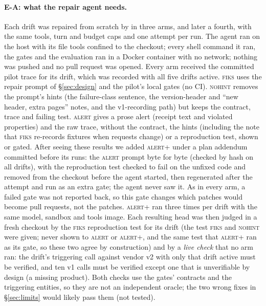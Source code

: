 \documentclass[10pt]{article}
\newcommand{\fiks}{\textsc{fiks}}
\begin{document}
\begin{table}[t]
\centering\small
\caption{E-B response mutations on recorded v1 traffic (run \texttt{\expDetectRunId}). ``Tool error'': the server returned an error result (not silent). Recall = flagged / applicable. ``Coupled'': the operator maps onto that contract kind by construction.}
\label{tab:detect}

\end{table}

\paragraph{E-A: what the repair agent needs.} Each drift was repaired from scratch by \repairModel{} in three arms, and later a fourth, with the same tools, turn and budget caps and one attempt per run. The agent ran on the host with its file tools confined to the checkout; every shell command it ran, the gates and the evaluation ran in a Docker container with no network; nothing was pushed and no pull request was opened. Every arm received the committed pilot trace for its drift, which was recorded with all five drifts active. \textsc{fiks} uses the repair prompt of \S\ref{sec:design} and the pilot's local gates (no CI). \textsc{nohint} removes the prompt's hints (the failure-class sentence, the version-header and ``new header, extra pages'' notes, and the v1-recording path) but keeps the contract, trace and failing test. \textsc{alert} gives a prose alert (receipt text and violated properties) and the raw trace, without the contract, the hints (including the note that \fiks{} re-records fixtures when requests change) or a reproduction test, shown or gated. After seeing these results we added \textsc{alert+} under a plan addendum committed before its runs: the \textsc{alert} prompt byte for byte (checked by hash on all \expAlertPromptDrifts{} drifts), with the reproduction test checked to fail on the unfixed code and removed from the checkout before the agent started, then regenerated after the attempt and run as an extra gate; the agent never saw it. As in every arm, a failed gate was not reported back, so this gate changes which patches would become pull requests, not the patches. \textsc{alert+} ran three times per drift with the same model, sandbox and tools image. Each resulting head was then judged in a fresh checkout by the \fiks{} reproduction test for its drift (the test \textsc{fiks} and \textsc{nohint} were given; never shown to \textsc{alert} or \textsc{alert+}, and the same test that \textsc{alert+} ran as its gate, so these two agree by construction) and by a \emph{live check} that no arm ran: the drift's triggering call against vendor v2 with only that drift active must be verified, and ten v1 calls must be verified except one that is unverifiable by design (a missing product). Both checks use the gates' contracts and the triggering entities, so they are not an independent oracle; the two wrong fixes in \S\ref{sec:limits} would likely pass them (not tested).
\end{document}
